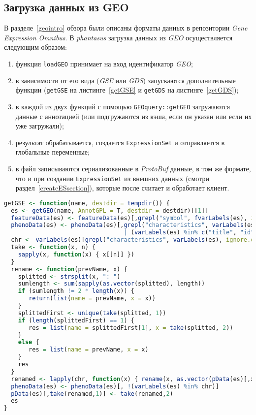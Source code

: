 \subsection{Загрузка данных из GEO}
В разделе~\ref{geointro} обзора были описаны форматы данных в репозитории \emph{Gene Expression Omnibus}.
В \emph{phantasus} загрузка данных из \emph{GEO} осуществляется следующим образом:
\begin{enumerate}
\item функция \texttt{loadGEO} принимает на вход идентификатор \emph{GEO};
\item в зависимости от его вида (\emph{GSE} или \emph{GDS}) запускаются дополнительные функции (\texttt{getGSE} на листинге~\ref{getGSE} и \texttt{getGDS} на листинге~\ref{getGDS});
\item в каждой из двух функций с помощью \texttt{GEOquery::getGEO} загружаются данные с аннотацией (или подгружаются из кэша, если он указан или если их уже загружали);
\item результат обрабатывается, создается \texttt{ExpressionSet} и отправляется в глобальные переменные;
\item в файл записываются сериализованные в \emph{ProtoBuf} данные, в том же формате, что и при создании \texttt{ExpressionSet} из внешних данных (смотри раздел~\ref{createESsection}), которые после считает и обработает клиент.
\end{enumerate}
\begin{lstlisting}[float=!h,caption={Загрузка данных типа GSE из Gene Expression Omnibus},label={getGSE},language=R]
getGSE <- function(name, destdir = tempdir()) {
  es <- getGEO(name, AnnotGPL = T, destdir = destdir)[[1]]
  featureData(es) <- featureData(es)[,grepl("symbol", fvarLabels(es), ignore.case = T)]
  phenoData(es) <- phenoData(es)[,grepl("characteristics", varLabels(es), ignore.case = T)
                                  | (varLabels(es) %in% c("title", "id", "geo_accession"))]
  chr <- varLabels(es)[grepl("characteristics", varLabels(es), ignore.case = T)]
  take <- function(x, n) {
    sapply(x, function(x) { x[[n]] })
  }
  rename <- function(prevName, x) {
    splitted <- strsplit(x, ": ")
    sumlength <- sum(sapply(as.vector(splitted), length))
    if (sumlength != 2 * length(x)) {
       return(list(name = prevName, x = x))
    }
    splittedFirst <- unique(take(splitted, 1))
    if (length(splittedFirst) == 1) {
       res = list(name = splittedFirst[1], x = take(splitted, 2))
    }
    else {
       res = list(name = prevName, x = x)
    }
    res
  }
  renamed <- lapply(chr, function(x) { rename(x, as.vector(pData(es)[,x])) })
  phenoData(es) <- phenoData(es)[, !(varLabels(es) %in% chr)]
  pData(es)[,take(renamed,1)] <- take(renamed,2)
  es
}
\end{lstlisting}

